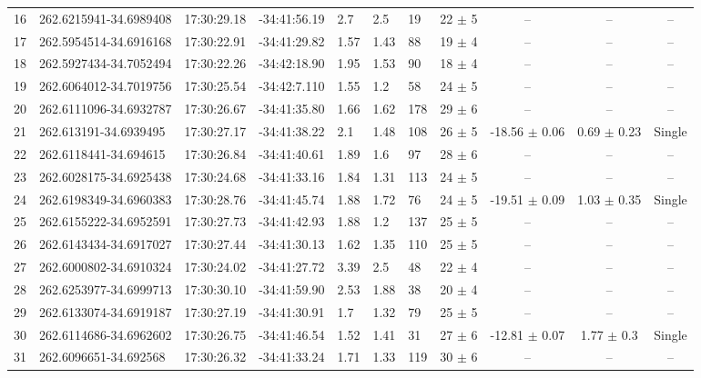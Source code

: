 \documentclass[longauth]{aa} %
\begin{document}
\begin{appendix}
\begin{table}[htbp!]
\begin{tabular}{llllllllccc}
16  &  262.6215941-34.6989408  &  17:30:29.18  &  -34:41:56.19  &  2.7  &  2.5  &  19  &  22 $\pm$ 5  &  --  &  --  &  -- \\
17  &  262.5954514-34.6916168  &  17:30:22.91  &  -34:41:29.82  &  1.57  &  1.43  &  88  &  19 $\pm$ 4  &  --  &  --  &  -- \\
18  &  262.5927434-34.7052494  &  17:30:22.26  &  -34:42:18.90  &  1.95  &  1.53  &  90  &  18 $\pm$ 4  &  --  &  --  &  -- \\
19  &  262.6064012-34.7019756  &  17:30:25.54  &  -34:42:7.110  &  1.55  &  1.2  &  58  &  24 $\pm$ 5  &  --  &  --  &  -- \\
20  &  262.6111096-34.6932787  &  17:30:26.67  &  -34:41:35.80  &  1.66  &  1.62  &  178  &  29 $\pm$ 6  &  --  &  --  &  -- \\
21  &  262.613191-34.6939495  &  17:30:27.17  &  -34:41:38.22  &  2.1  &  1.48  &  108  &  26 $\pm$ 5  &  -18.56 $\pm$ 0.06  &  0.69 $\pm$ 0.23  &  Single \\
22  &  262.6118441-34.694615  &  17:30:26.84  &  -34:41:40.61  &  1.89  &  1.6  &  97  &  28 $\pm$ 6  &  --  &  --  &  -- \\
23  &  262.6028175-34.6925438  &  17:30:24.68  &  -34:41:33.16  &  1.84  &  1.31  &  113  &  24 $\pm$ 5  &  --  &  --  &  -- \\
24  &  262.6198349-34.6960383  &  17:30:28.76  &  -34:41:45.74  &  1.88  &  1.72  &  76  &  24 $\pm$ 5  &  -19.51 $\pm$ 0.09  &  1.03 $\pm$ 0.35  &  Single \\
25  &  262.6155222-34.6952591  &  17:30:27.73  &  -34:41:42.93  &  1.88  &  1.2  &  137  &  25 $\pm$ 5  &  --  &  --  &  -- \\
26  &  262.6143434-34.6917027  &  17:30:27.44  &  -34:41:30.13  &  1.62  &  1.35  &  110  &  25 $\pm$ 5  &  --  &  --  &  -- \\
27  &  262.6000802-34.6910324  &  17:30:24.02  &  -34:41:27.72  &  3.39  &  2.5  &  48  &  22 $\pm$ 4  &  --  &  --  &  -- \\
28  &  262.6253977-34.6999713  &  17:30:30.10  &  -34:41:59.90  &  2.53  &  1.88  &  38  &  20 $\pm$ 4  &  --  &  --  &  -- \\
29  &  262.6133074-34.6919187  &  17:30:27.19  &  -34:41:30.91  &  1.7  &  1.32  &  79  &  25 $\pm$ 5  &  --  &  --  &  -- \\
30  &  262.6114686-34.6962602  &  17:30:26.75  &  -34:41:46.54  &  1.52  &  1.41  &  31  &  27 $\pm$ 6  &  -12.81 $\pm$ 0.07  &  1.77 $\pm$ 0.3  &  Single \\
31  &  262.6096651-34.692568  &  17:30:26.32  &  -34:41:33.24  &  1.71  &  1.33  &  119  &  30 $\pm$ 6  &  --  &  --  &  -- \\

\end{tabular}
\end{table}
\end{appendix}
\end{document}
